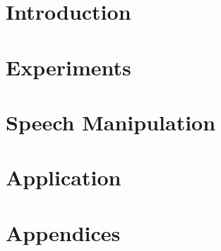 \documentclass[11pt, openright, titlepage, table, twoside]{book}
\begin{document}
\maketitle



\addtocounter{page}{1} %


% 

\part{Introduction}
\label{part:introduction}





\part{Experiments}
\label{part:experiments}





\part{Speech Manipulation}
\label{part:speech_manipulation}

\part{Application}
\label{part:application}







\printbibliography[heading=bibintoc, title={Bibliography}]


\appendix

\renewcommand{\thesection}{\Roman{section}} 
\renewcommand{\thesubsection}{\thesection.\Roman{subsection}}

\part{Appendices}
\label{part:appendices}





\end{document}
